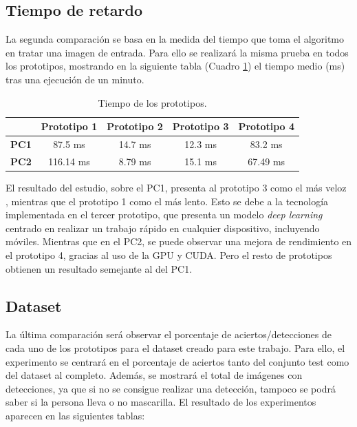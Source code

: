\vspace{-0.7cm}
\subsection*{Tiempo de retardo}
\vspace{-0.5cm}

La segunda comparación se basa en la medida del tiempo que toma el algoritmo en tratar una imagen de entrada. Para ello se realizará la misma prueba en todos los prototipos, mostrando en la siguiente tabla (Cuadro \ref{tab:table4}) el tiempo medio (ms) tras una ejecución de un minuto.

\begin{table}[h!]
	\begin{center}
		\begin{tabular}{ |c|c|c|c|c| } 
			\hline
			& \textbf{Prototipo 1} & \textbf{Prototipo 2} & \textbf{Prototipo 3} & \textbf{Prototipo 4} \\
			\hline
			\textbf{PC1} & 87.5 ms & 14.7 ms  & 12.3 ms & 83.2 ms \\
			\hline
			\textbf{PC2} & 116.14 ms & 8.79 ms  & 15.1 ms & 67.49 ms \\
			\hline
		\end{tabular}
		\caption{Tiempo de los prototipos.}
		\label{tab:table4}
	\end{center}
\end{table}

El resultado del estudio, sobre el PC1, presenta al prototipo 3 como el más veloz , mientras que el prototipo 1 como el más lento. Esto se debe a la tecnología implementada en el tercer prototipo, que presenta un modelo \textit{deep learning} centrado en realizar un trabajo rápido en cualquier dispositivo, incluyendo móviles. Mientras que en el PC2, se puede observar una mejora de rendimiento en el prototipo 4, gracias al uso de la GPU y CUDA. Pero el resto de prototipos obtienen un resultado semejante al del PC1.

\vspace{-0.7cm}
\subsection*{Dataset}
\vspace{-0.5cm}

La última comparación será observar el porcentaje de aciertos/detecciones de cada uno de los prototipos para el dataset creado para este trabajo. Para ello, el experimento se centrará en el porcentaje de aciertos tanto del conjunto test como del dataset al completo. Además, se mostrará el total de imágenes con detecciones, ya que si no se consigue realizar una detección, tampoco se podrá saber si la persona lleva o no mascarilla. El resultado de los experimentos aparecen en las siguientes tablas:


